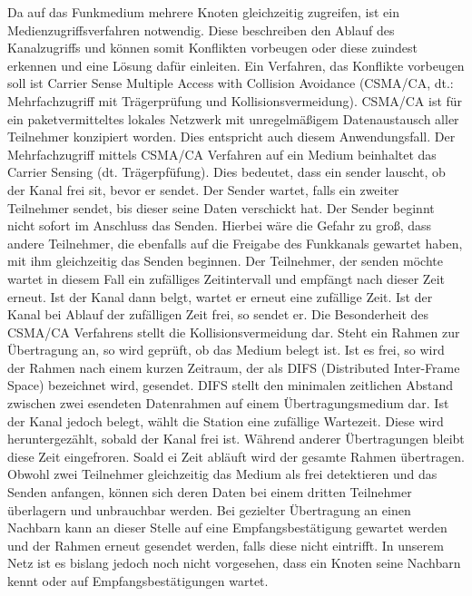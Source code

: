\documentclass{IEEEtran}
\begin{document}
    Da auf das Funkmedium mehrere Knoten gleichzeitig zugreifen, ist ein Medienzugriffsverfahren notwendig. Diese beschreiben den Ablauf des Kanalzugriffs und können somit Konflikten vorbeugen oder diese zuindest erkennen und eine Lösung dafür einleiten. Ein Verfahren, das Konflikte vorbeugen soll ist Carrier Sense Multiple Access with Collision Avoidance (CSMA/CA, dt.: Mehrfachzugriff mit Trägerprüfung und Kollisionsvermeidung). CSMA/CA ist für ein paketvermitteltes lokales Netzwerk mit unregelmäßigem Datenaustausch aller Teilnehmer konzipiert worden. Dies entspricht auch diesem Anwendungsfall.
    Der Mehrfachzugriff mittels CSMA/CA Verfahren auf ein Medium beinhaltet das Carrier Sensing (dt. Trägerpfüfung). Dies bedeutet, dass ein sender lauscht, ob der Kanal frei sit, bevor er sendet. Der Sender wartet, falls ein zweiter Teilnehmer sendet, bis dieser seine Daten verschickt hat. Der Sender beginnt nicht sofort im Anschluss das Senden. Hierbei wäre die Gefahr zu groß, dass andere Teilnehmer, die ebenfalls auf die Freigabe des Funkkanals gewartet haben, mit ihm gleichzeitig das Senden beginnen. Der Teilnehmer, der senden möchte wartet in diesem Fall ein zufälliges Zeitintervall und empfängt nach dieser Zeit erneut. Ist der Kanal dann belgt, wartet er erneut eine zufällige Zeit. Ist der Kanal bei Ablauf der zufälligen Zeit frei, so sendet er.
    Die Besonderheit des CSMA/CA Verfahrens stellt die Kollisionsvermeidung dar. Steht ein Rahmen zur Übertragung an, so wird geprüft, ob das Medium belegt ist. Ist es frei, so wird der Rahmen nach einem kurzen Zeitraum, der als DIFS (Distributed Inter-Frame Space) bezeichnet wird, gesendet. DIFS stellt den minimalen zeitlichen Abstand zwischen zwei esendeten Datenrahmen auf einem Übertragungsmedium dar. Ist der Kanal jedoch belegt, wählt die Station eine zufällige Wartezeit. Diese wird heruntergezählt, sobald der Kanal frei ist. Während anderer Übertragungen bleibt diese Zeit eingefroren. Soald ei Zeit abläuft wird der gesamte Rahmen übertragen. 
    Obwohl zwei Teilnehmer gleichzeitig das Medium als frei detektieren und das Senden anfangen, können sich deren Daten bei einem dritten Teilnehmer überlagern und unbrauchbar werden. Bei gezielter Übertragung an einen Nachbarn kann an dieser Stelle auf eine Empfangsbestätigung gewartet werden und der Rahmen erneut gesendet werden, falls diese nicht eintrifft. In unserem Netz ist es bislang jedoch noch nicht vorgesehen, dass ein Knoten seine Nachbarn kennt oder auf Empfangsbestätigungen wartet. 
\end{document}
